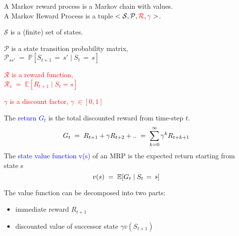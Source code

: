 \documentclass[landscape]{article}
\def\tcr{\textcolor{red}}
\def\tcb{\textcolor{blue}}
\begin{document}
\newpage
\newvgtitle{\tcb{Markov Reward Process}}
\LARGE
\vspace{-.5em}
\vspace{0.5cm}
A Markov reward process is a Markov chain with values.\\
\vspace{0.5cm}
A Markov Reward Process is a tuple $<\mathcal{S}, \mathcal{P}, \tcr{\mathcal{R}}, \tcr{\gamma} >$.\\
\begin{itemize}
    \item $\mathcal{S}$ is a (finite) set of states.\\
    \item $\mathcal{P}$ is a state transition probability matrix,\\
    $\mathcal{P}_{ss'}\;=\; \mathbb{P}[S_{t+1}\,=\,s' \;|\; S_{t}\,=\,s]$
    \tcr{
    \item $\mathcal{R}$ is a reward function, \\ $\mathcal{R}_s \;=\; \mathbb{E}[R_{t+1}\;|\; S_t = s]$\\
    \item ${\gamma}$ is a discount factor, ${\gamma}\; \in [0,1]$
    }
\end{itemize}
The \tcb{return $G_t$} is the total discounted reward from time-step $t$.
\begin{equation}\notag
    G_t\; =\; R_{t+1}+{\gamma}R_{t+2}+ .. \;=\; \sum\limits_{k=0}^\infty {\gamma}^k R_{t+k+1}
\end{equation}
The \tcb{state value function v(s)} of an MRP is the expected return starting from state s
\begin{equation}\notag
    v(s)\;=\;\mathbb{E}[G_t \;|\; S_t\,=\,s]
\end{equation}


\newpage
\newvgtitle{\tcb{Bellman Equation for MRPs}}
\LARGE
\vspace{-.5em}
\vspace{0.5cm}
The value function can be decomposed into two parts:\\
\begin{itemize}
    \item immediate reward $R_{t+1}$
    \item discounted value of successor state ${\gamma}v(S_{t+1})$
\end{itemize}
\end{document}
